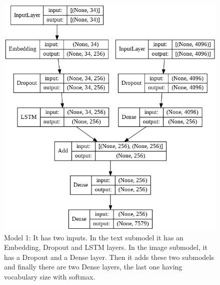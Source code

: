 \documentclass{article} %
\begin{document}
\begin{figure}[ht]
\includegraphics[width=\textwidth]{rnn_model_1_vgg16.png}
\caption{Model 1: It has two inputs. In the text submodel it has an Embedding, Dropout and LSTM layers. In the image submodel, it has a Dropout and a Dense layer. Then it adds these two submodels and finally there are two Dense layers, the last one having vocabulary size with softmax.}
\label{Model1}
\end{figure}
\end{document}
